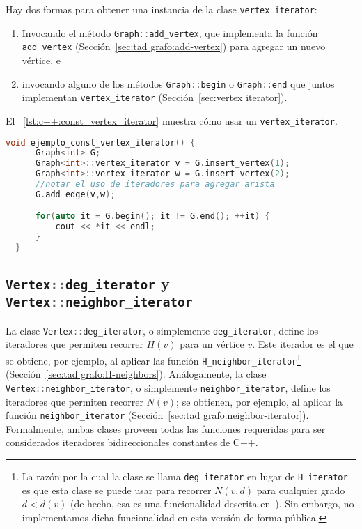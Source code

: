\documentclass[%
    a4paper,%
    fontsize=12pt,%
    DIV=12,
    twoside,%
    openright,%
    titlepage=true,%
    headsepline,%
    toc=bibliography,%
    parskip=half,%
    cleardoublepage=empty,%
    headings=big,%
]{scrbook}
\makeatletter
\newcommand{\Code}[2][]{\lstinline[basicstyle={\ttfamily},#1]@#2@}
\newcommand{\CPPCode}[2][]{\lstinline[language=C++,basicstyle={\ttfamily},#1]@#2@}
\DeclareRobustCommand{\CPP}{C\nolinebreak[4]\hspace{-.05em}\raisebox{.4ex}{\relsize{-3}\textbf{++}}\xspace}
\def\CPP{C++}%
\makeatother
\begin{document}
Hay dos formas para obtener una instancia de la clase \CPPCode{vertex_iterator}:
\begin{enumerate}[1.]
  \item Invocando el método \CPPCode{Graph::add_vertex}, que implementa la función \Code{add_vertex} (Sección~\ref{sec:tad grafo:add-vertex}) para agregar un nuevo vértice, e
  \item invocando alguno de los métodos \CPPCode{Graph::begin} o \CPPCode{Graph::end} que juntos implementan \Code{vertex_iterator} (Sección~\ref{sec:vertex iterator}).
\end{enumerate}
El \lstlistingname~\ref{lst:c++:const_vertex_iterator} muestra cómo usar un \CPPCode{vertex_iterator}.


\begin{lstlisting}[caption={Ejemplo de uso de \CPPCode{vertex_iterator} para manipular el grafo.  En el ejemplo, se crean dos vértices unidos por una arista y se imprimen los dos vértices.},name=const_vertex_iterator,gobble=2,float=ht,label={lst:c++:const_vertex_iterator},language=C++]
  void ejemplo_const_vertex_iterator() {
      Graph<int> G;
      Graph<int>::vertex_iterator v = G.insert_vertex(1);
      Graph<int>::vertex_iterator w = G.insert_vertex(2);
      //notar el uso de iteradores para agregar arista
      G.add_edge(v,w);

      for(auto it = G.begin(); it != G.end(); ++it) {
          cout << *it << endl;
      }
  }
\end{lstlisting}

\subsection{\texorpdfstring{\protect\CPPCode{Vertex::deg_iterator}}{Vertex::deg\_iterator} y \texorpdfstring{\protect\CPPCode{Vertex::neighbor_iterator}}{Vertex::neighbor\_iterator}}
\label{sec:deg_iterator}

La clase \CPPCode{Vertex::deg_iterator}, o simplemente \CPPCode{deg_iterator}, define los iteradores que permiten recorrer $H(v)$ para un vértice $v$. Este iterador es el que se obtiene, por ejemplo, al aplicar las función \Code{H_neighbor_iterator}\footnote{La razón por la cual la clase se llama \CPPCode{deg_iterator} en lugar de \CPPCode{H_iterator} es que esta clase se puede usar para recorrer $N(v, d)$ para cualquier grado $d < d(v)$ (de hecho, esa es una funcionalidad descrita en~\cite{LinSoulignacSzwarcfiterTCS2012}).  Sin embargo, no implementamos dicha funcionalidad en esta versión de forma pública.} (Sección~\ref{sec:tad grafo:H-neighbors}).  Análogamente, la clase \CPPCode{Vertex::neighbor_iterator}, o simplemente \CPPCode{neighbor_iterator}, define los iteradores que permiten recorrer $N(v)$; se obtienen, por ejemplo, al aplicar la función \Code{neighbor_iterator} (Sección~\ref{sec:tad grafo:neighbor-iterator}).  Formalmente, ambas clases proveen todas las funciones requeridas para ser considerados iteradores bidireccionales constantes de \CPP.
\end{document}
